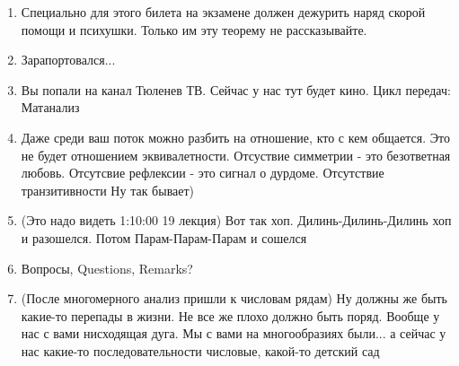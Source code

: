 \begin{enumerate}
    \item Специально для этого билета на экзамене должен дежурить наряд скорой помощи и психушки. Только им эту теорему не рассказывайте. 

    \item Зарапортовался...

    \item Вы попали на канал Тюленев ТВ. Сейчас у нас тут будет кино. Цикл передач: Матанализ

    \item Даже среди ваш поток можно разбить на отношение, кто с кем общается. Это не будет отношением эквивалетности. Отсуствие симметрии - это безответная любовь. Отсутсвие рефлексии - это сигнал о дурдоме. Отсутствие транзитивности Ну так бывает) 

    \item (Это надо видеть 1:10:00 19 лекция) Вот так хоп. Дилинь-Дилинь-Дилинь хоп и разошелся. Потом Парам-Парам-Парам и сошелся

    \item Вопросы, Questions, Remarks?

    \item (После многомерного анализ пришли к числовам рядам) Ну должны же быть какие-то перепады в жизни. Не все же плохо должно быть поряд. Вообще у нас с вами нисходящая дуга. Мы с вами на многообразиях были... а сейчас у нас какие-то последовательности числовые, какой-то детский сад
\end{enumerate}